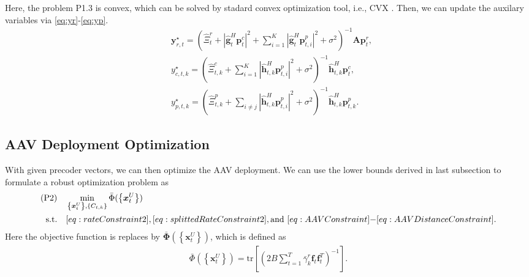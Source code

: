 \documentclass[twocolumn,journal]{IEEEtran}
\begin{document}
Here, the problem P1.3 is convex, which can be solved by stadard convex optimization tool, i.e., CVX \cite{cvx}. Then, we can update the auxilary variables via \eqref{eq:yr}-\eqref{eq:yp}. 
\begin{subequations}
\begin{align}
    &\boldsymbol{y}_{r,t}^{\star} = \left(\hat{\Xi}^{r}_{t} + \left| \hat{\boldsymbol{g}}^{H}_{t}\boldsymbol{p}^{c}_{t}\right|^2 + \sum_{i=1}^{K}\left| \hat{\boldsymbol{g}}^{H}_{t}\boldsymbol{p}^{p}_{t,i}\right|^2 + \sigma^2\right)^{-1}\mathbf{A}\boldsymbol{p}^{r}_{t},\label{eq:yr}\\
    &y_{c,t,k}^{\star} = \left( \hat{\Xi}^{c}_{t,k} +  \sum_{i=1}^{K}\left| \hat{\boldsymbol{h}}^{H}_{t,k}\boldsymbol{p}^{p}_{t,i}\right|^2 + \sigma^2 \right)^{-1}\hat{\boldsymbol{h}}^{H}_{t,k}\boldsymbol{p}^{c}_{t},\label{eq:yc}\\
    &y_{p,t,k}^{\star} = \left( \hat{\Xi}^{p}_{t,k} +  \sum_{i\neq j}\left| \hat{\boldsymbol{h}}^{H}_{t,k}\boldsymbol{p}^{p}_{t,i}\right|^2 + \sigma^2  \right)^{-1}\hat{\boldsymbol{h}}^{H}_{t,k}\boldsymbol{p}^{p}_{t,k}.\label{eq:yp}
\end{align}
\end{subequations}
\subsection{AAV Deployment Optimization}
With given precoder vectors, we can then optimize the AAV deployment. We can use the lower bounds derived in last subsection to formulate a robust optimization problem as 
\begin{align}
    (\text{P2})\quad&\min_{\left\{\boldsymbol{x}^{U}_{t}\right\},\left\{C_{t,k}\right\}} \bar{{\Phi}}(\left\{\boldsymbol{x}^{U}_{t}\right\})\label{eq:objP2}\\
    \text{s.t.}\quad& \eqref{eq:rateConstraint2}, \eqref{eq:splittedRateConstraint2}, \text{and } \eqref{eq:AAVConstraint}\mbox{-}\eqref{eq:AAVDistanceConstraint}.\notag
\end{align}
Here the objective function is replaces by \(\bar{\mathbf{\Phi}}(\left\{\boldsymbol{x}^{U}_{t}\right\})\), which is defined as
\begin{align}
    \bar{{\Phi}}(\left\{\boldsymbol{x}^{U}_{t}\right\}) = \text{tr}\left[\left(2B\sum_{t=1}^{T} \bar{\gamma}_{k}^{r}\boldsymbol{f}_{t}\boldsymbol{f}^{T}_{t}\right)^{-1}\right].
\end{align}
\end{document}
